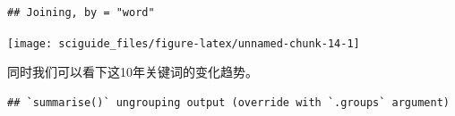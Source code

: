 \documentclass[]{tufte-book}
\newenvironment{Shaded}{}{}
\newcommand{\CommentTok}[1]{\textcolor[rgb]{0.38,0.63,0.69}{\textit{#1}}}
\newcommand{\DataTypeTok}[1]{\textcolor[rgb]{0.56,0.13,0.00}{#1}}
\newcommand{\DecValTok}[1]{\textcolor[rgb]{0.25,0.63,0.44}{#1}}
\newcommand{\KeywordTok}[1]{\textcolor[rgb]{0.00,0.44,0.13}{\textbf{#1}}}
\newcommand{\NormalTok}[1]{#1}
\newcommand{\OperatorTok}[1]{\textcolor[rgb]{0.40,0.40,0.40}{#1}}
\newcommand{\OtherTok}[1]{\textcolor[rgb]{0.00,0.44,0.13}{#1}}
\newcommand{\StringTok}[1]{\textcolor[rgb]{0.25,0.44,0.63}{#1}}
\begin{document}
\begin{verbatim}
## Joining, by = "word"
\end{verbatim}

\begin{Shaded}
\end{Shaded}

\texttt{[image: sciguide\_files/figure-latex/unnamed-chunk-14-1]}

同时我们可以看下这10年关键词的变化趋势。

\begin{Shaded}
\end{Shaded}

\begin{verbatim}
## `summarise()` ungrouping output (override with `.groups` argument)
\end{verbatim}
\end{document}
